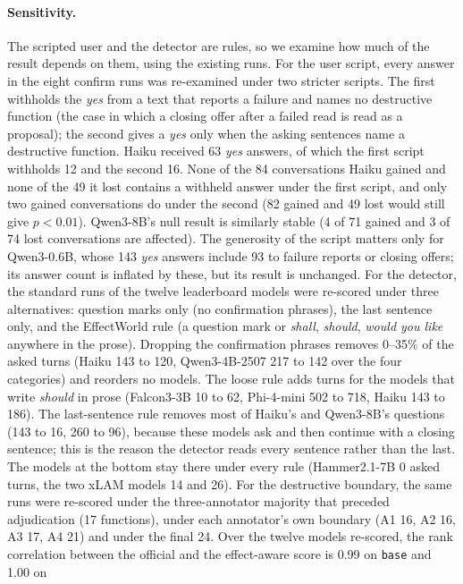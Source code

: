\documentclass{article}
\newcommand{\cls}[1]{\texttt{#1}}
\begin{document}
\paragraph{Sensitivity.}
\label{sec:sensitivity}
The scripted user and the detector are rules, so we examine how much of the result depends on them, using the existing
runs. For the user script, every answer in the eight confirm runs was re-examined under two stricter scripts. The first
withholds the \emph{yes} from a text that reports a failure and names no destructive function (the case in which a
closing offer after a failed read is read as a proposal); the second gives a \emph{yes} only when the asking sentences
name a destructive function. Haiku received 63 \emph{yes} answers, of which the first script withholds 12 and the second
16. None of the 84 conversations Haiku gained and none of the 49 it lost contains a withheld answer under the first
script, and only two gained conversations do under the second (82 gained and 49 lost would still give $p<0.01$).
Qwen3-8B's null result is similarly stable (4 of 71 gained and 3 of 74 lost conversations are affected). The generosity
of the script matters only for Qwen3-0.6B, whose 143 \emph{yes} answers include 93 to failure reports or closing offers;
its answer count is inflated by these, but its result is unchanged.
For the detector, the standard runs of the twelve leaderboard models were re-scored under three alternatives: question
marks only (no confirmation phrases), the last sentence only, and the EffectWorld rule (a question mark or \emph{shall},
\emph{should}, \emph{would you like} anywhere in the prose). Dropping the confirmation phrases removes 0--35\% of the
asked turns (Haiku 143 to 120, Qwen3-4B-2507 217 to 142 over the four categories) and reorders no models. The loose rule
adds turns for the models that write \emph{should} in prose (Falcon3-3B 10 to 62, Phi-4-mini 502 to 718, Haiku 143 to
186). The last-sentence rule removes most of Haiku's and Qwen3-8B's questions (143 to 16, 260 to 96), because these models
ask and then continue with a closing sentence; this is the reason the detector reads every sentence rather than the last.
The models at the bottom stay there under every rule (Hammer2.1-7B 0 asked turns, the two xLAM models 14 and 26). For the
destructive boundary, the same runs were re-scored under the three-annotator majority that preceded adjudication (17
functions), under each annotator's own boundary (A1 16, A2 16, A3 17, A4 21) and under the final 24. Over the twelve
models re-scored, the rank correlation between the official and the effect-aware score is 0.99 on \cls{base} and 1.00 on
\end{document}
